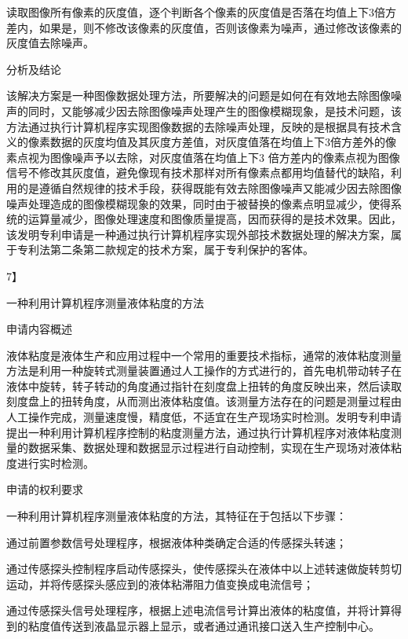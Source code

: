 读取图像所有像素的灰度值，逐个判断各个像素的灰度值是否落在均值上下3倍方差内，如果是，则不修改该像素的灰度值，否则该像素为噪声，通过修改该像素的灰度值去除噪声。

{\setlength{\parindent}{22.5bp}分析及结论\par}

该解决方案是一种图像数据处理方法，所要解决的问题是如何在有效地去除图像噪声的同时，又能够减少因去除图像噪声处理产生的图像模糊现象，是技术问题，该方法通过执行计算机程序实现图像数据的去除噪声处理，反映的是根据具有技术含义的像素数据的灰度均值及其灰度方差值，对灰度值落在均值上下3倍方差外的像素点视为图像噪声予以去除，对灰度值落在均值上下3 倍方差内的像素点视为图像信号不修改其灰度值，避免像现有技术那样对所有像素点都用均值替代的缺陷，利用的是遵循自然规律的技术手段，获得既能有效去除图像噪声又能减少因去除图像噪声处理造成的图像模糊现象的效果，同时由于被替换的像素点明显减少，使得系统的运算量减少，图像处理速度和图像质量提高，因而获得的是技术效果。因此，该发明专利申请是一种通过执行计算机程序实现外部技术数据处理的解决方案，属于专利法第二条第二款规定的技术方案，属于专利保护的客体。

{7】\par}

一种利用计算机程序测量液体粘度的方法

{\setlength{\parindent}{22.5bp}申请内容概述\par}

液体粘度是液体生产和应用过程中一个常用的重要技术指标，通常的液体粘度测量方法是利用一种旋转式测量装置通过人工操作的方式进行的，首先电机带动转子在液体中旋转，转子转动的角度通过指针在刻度盘上扭转的角度反映出来，然后读取刻度盘上的扭转角度，从而测出液体粘度值。该测量方法存在的问题是测量过程由人工操作完成，测量速度慢，精度低，不适宜在生产现场实时检测。发明专利申请提出一种利用计算机程序控制的粘度测量方法，通过执行计算机程序对液体粘度测量的数据采集、数据处理和数据显示过程进行自动控制，实现在生产现场对液体粘度进行实时检测。

{\setlength{\parindent}{22.5bp}申请的权利要求\par}

一种利用计算机程序测量液体粘度的方法，其特征在于包括以下步骤：

通过前置参数信号处理程序，根据液体种类确定合适的传感探头转速；

通过传感探头控制程序启动传感探头，使传感探头在液体中以上述转速做旋转剪切运动，并将传感探头感应到的液体粘滞阻力值变换成电流信号；

通过传感探头信号处理程序，根据上述电流信号计算出液体的粘度值，并将计算得到的粘度值传送到液晶显示器上显示，或者通过通讯接口送入生产控制中心。

